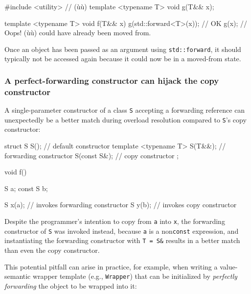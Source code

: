 \begin{emcppshiddenlisting}[emcppsbatch=e17]
#include <utility>      // (ù{}ù)
template <typename T>
void g(T&& x);
\end{emcppshiddenlisting}
\begin{emcppslisting}[emcppsbatch=e17]
template <typename T>
void f(T&& x)
{
    g(std::forward<T>(x));  // OK
    g(x);                   // Oops! (ù{}ù) could have already been moved from.
}
\end{emcppslisting}

\noindent Once an object has been passed as an argument using
\lstinline!std::forward!, it should typically not be accessed again
because it could now be in a
moved-from state.

\subsubsection[A perfect-forwarding constructor can hijack the copy constructor]{A perfect-forwarding constructor can hijack the copy constructor}\label{a-perfect-forwarding-constructor-can-hijack-the-copy-constructor}

A single-parameter constructor of a class \lstinline!S! accepting a
forwarding reference can unexpectedly be a better match during overload
resolution compared to \lstinline!S!'s copy constructor:

\begin{emcppslisting}
struct S
{
    S();                           // default constructor
    template <typename T> S(T&&);  // forwarding constructor
    S(const S&);                   // copy constructor
};

void f()
{
    S a;
    const S b;

    S x(a);  // invokes forwarding constructor
    S y(b);  // invokes copy constructor
}
\end{emcppslisting}

\noindent Despite the programmer's intention to copy from \lstinline!a! into
\lstinline!x!, the forwarding constructor of \lstinline!S! was invoked
instead, because \lstinline!a! is a non\lstinline!const! 
expression, and instantiating the forwarding constructor with
\lstinline!T!~\lstinline!=!~\lstinline!S&! results in a better match than even
the copy constructor.

This potential pitfall can arise in practice, for example, when writing
a value-semantic wrapper template (e.g., \lstinline!Wrapper!) that can be
initialized by \textit{perfectly forwarding} the object to be wrapped into it:

